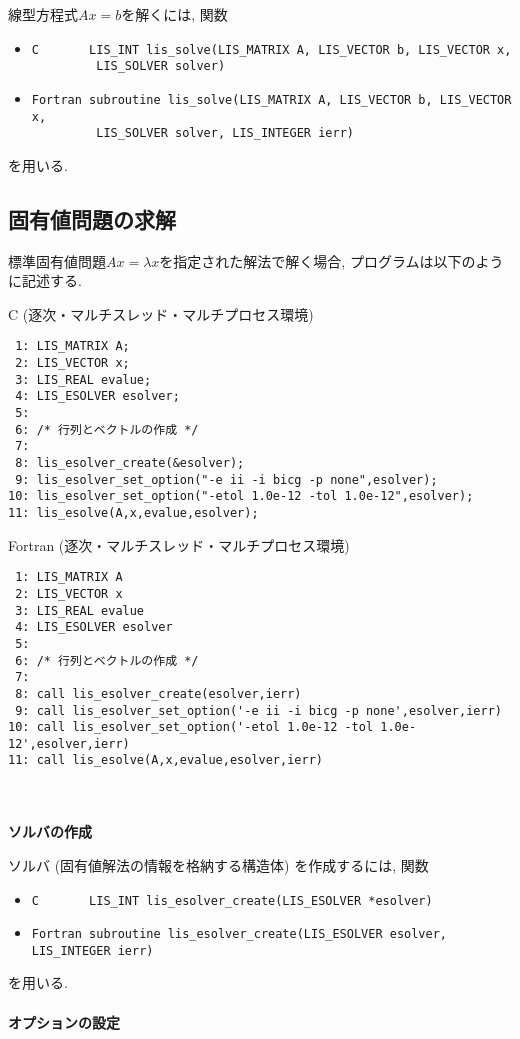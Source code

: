 \documentclass[a4paper]{jarticle}
\begin{document}
{{線型方程式$Ax=b$を解くには, 関数
\begin{itemize}
\item \verb|C       LIS_INT lis_solve(LIS_MATRIX A, LIS_VECTOR b, LIS_VECTOR x,|\\
      \verb|         LIS_SOLVER solver)|
\item \verb|Fortran subroutine lis_solve(LIS_MATRIX A, LIS_VECTOR b, LIS_VECTOR x,|\\
      \verb|         LIS_SOLVER solver, LIS_INTEGER ierr)|
\end{itemize}
を用いる. 

\subsection{固有値問題の求解}\label{subsec:esolve}
標準固有値問題$Ax=\lambda x$を指定された解法で解く場合, プログラムは以下のように記述する. 
\begin{itembox}[l]{C (逐次・マルチスレッド・マルチプロセス環境)}
\small
\begin{verbatim}
 1: LIS_MATRIX A; 
 2: LIS_VECTOR x; 
 3: LIS_REAL evalue; 
 4: LIS_ESOLVER esolver; 
 5:    
 6: /* 行列とベクトルの作成 */ 
 7:    
 8: lis_esolver_create(&esolver); 
 9: lis_esolver_set_option("-e ii -i bicg -p none",esolver); 
10: lis_esolver_set_option("-etol 1.0e-12 -tol 1.0e-12",esolver); 
11: lis_esolve(A,x,evalue,esolver); 
\end{verbatim}
\end{itembox}
\begin{itembox}[l]{Fortran (逐次・マルチスレッド・マルチプロセス環境)}
\small
\begin{verbatim}
 1: LIS_MATRIX A 
 2: LIS_VECTOR x 
 3: LIS_REAL evalue
 4: LIS_ESOLVER esolver 
 5:    
 6: /* 行列とベクトルの作成 */ 
 7:    
 8: call lis_esolver_create(esolver,ierr) 
 9: call lis_esolver_set_option('-e ii -i bicg -p none',esolver,ierr) 
10: call lis_esolver_set_option('-etol 1.0e-12 -tol 1.0e-12',esolver,ierr) 
11: call lis_esolve(A,x,evalue,esolver,ierr) 
\end{verbatim}
\end{itembox}
\\ \\
\noindent
{\bf ソルバの作成}

ソルバ (固有値解法の情報を格納する構造体) を作成するには, 関数
\begin{itemize}
\item \verb|C       LIS_INT lis_esolver_create(LIS_ESOLVER *esolver)|
\item \verb|Fortran subroutine lis_esolver_create(LIS_ESOLVER esolver, LIS_INTEGER ierr) |
\end{itemize}
を用いる. 
\\ \\
\noindent
{\bf オプションの設定}

}}
\end{document}
